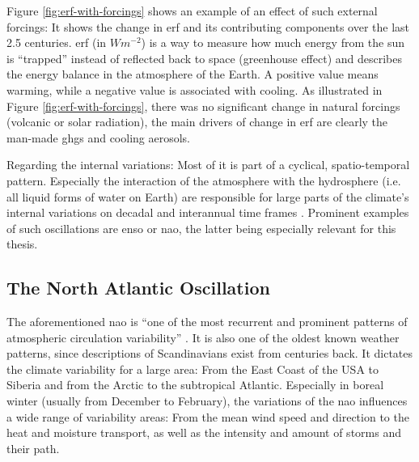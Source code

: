Figure \ref{fig:erf-with-forcings} shows an example of an effect of such external forcings: It shows the change in \ac{erf} and its contributing components over the last 2.5 centuries. 
\ac{erf} (in $Wm^{-2}$) is a way to measure how much energy from the sun is \enquote{trapped} instead of reflected back to space (greenhouse effect) and describes the energy balance in the atmosphere of the Earth. 
A positive value means warming, while a negative value is associated with cooling. 
As illustrated in Figure \ref{fig:erf-with-forcings}, there was no significant change in natural forcings (volcanic or solar radiation), the main drivers of change in \ac{erf} are clearly the man-made \acp{ghg} and cooling aerosols. \cite{intergovernmental_panel_on_climate_change_ipcc_climate_2023}

Regarding the internal variations: Most of it is part of a cyclical, spatio-temporal pattern. Especially the interaction of the atmosphere with the hydrosphere (i.e. all liquid forms of water on Earth) are responsible for large parts of the climate's internal variations on decadal and interannual time frames \cite{vietinghoffdiss}. 
Prominent examples of such oscillations are \ac{enso} or \ac{nao}, the latter being especially relevant for this thesis. 


\subsection{The North Atlantic Oscillation}
\label{sec:nao}


The aforementioned \ac{nao} is \enquote{one of the most recurrent and prominent patterns of atmospheric circulation variability} \cite{hurrell_overview_2003}. 
It is also one of the oldest known weather patterns, since descriptions of Scandinavians exist from centuries back. 
It dictates the climate variability for a large area: From the East Coast of the USA to Siberia and from the Arctic to the subtropical Atlantic.
Especially in boreal winter (usually from December to February), the variations of the \ac{nao} influences a wide range of variability areas: From the mean wind speed and direction to the heat and moisture transport, as well as the intensity and amount of storms and their path. \cite{hurrell_overview_2003}

